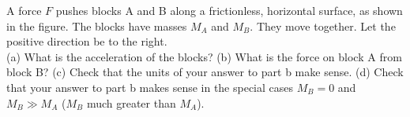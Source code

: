 A force $F$ pushes blocks A and B along a frictionless, horizontal
surface, as shown in the figure. The blocks have masses $M_A$ and $M_B$.
They move together. Let the positive direction be to the right.\\
%
(a) What is the acceleration of the blocks?\answercheck\hwendpart
%
(b) What is the force on block A from block B?\answercheck\hwendpart
%
(c) Check that the units of your answer to part b make sense.\hwendpart
%
(d) Check that your answer to part b makes sense in the special cases
$M_B=0$ and $M_B\gg M_A$ ($M_B$ much greater than $M_A$).
